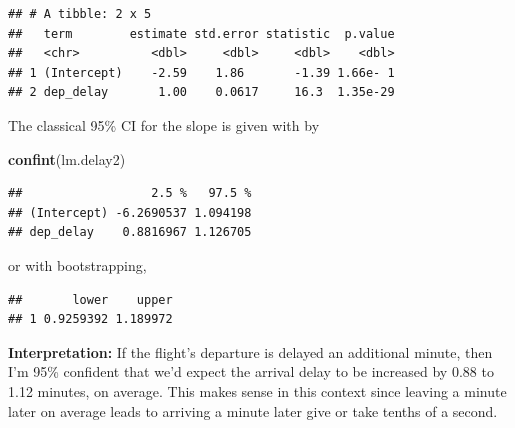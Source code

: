 \documentclass[
]{book}
\newenvironment{Shaded}{\begin{snugshade}}{\end{snugshade}}
\newcommand{\CommentTok}[1]{\textcolor[rgb]{0.56,0.35,0.01}{\textit{#1}}}
\newcommand{\DataTypeTok}[1]{\textcolor[rgb]{0.13,0.29,0.53}{#1}}
\newcommand{\DecValTok}[1]{\textcolor[rgb]{0.00,0.00,0.81}{#1}}
\newcommand{\FloatTok}[1]{\textcolor[rgb]{0.00,0.00,0.81}{#1}}
\newcommand{\KeywordTok}[1]{\textcolor[rgb]{0.13,0.29,0.53}{\textbf{#1}}}
\newcommand{\NormalTok}[1]{#1}
\newcommand{\OperatorTok}[1]{\textcolor[rgb]{0.81,0.36,0.00}{\textbf{#1}}}
\newcommand{\OtherTok}[1]{\textcolor[rgb]{0.56,0.35,0.01}{#1}}
\newcommand{\StringTok}[1]{\textcolor[rgb]{0.31,0.60,0.02}{#1}}
\begin{document}
\begin{verbatim}
## # A tibble: 2 x 5
##   term        estimate std.error statistic  p.value
##   <chr>          <dbl>     <dbl>     <dbl>    <dbl>
## 1 (Intercept)    -2.59    1.86       -1.39 1.66e- 1
## 2 dep_delay       1.00    0.0617     16.3  1.35e-29
\end{verbatim}

The classical 95\% CI for the slope is given with by

\begin{Shaded}
\begin{Highlighting}[]
\KeywordTok{confint}\NormalTok{(lm.delay2)}
\end{Highlighting}
\end{Shaded}

\begin{verbatim}
##                  2.5 %   97.5 %
## (Intercept) -6.2690537 1.094198
## dep_delay    0.8816967 1.126705
\end{verbatim}

or with bootstrapping,

\begin{Shaded}
\end{Shaded}

\begin{verbatim}
##       lower    upper
## 1 0.9259392 1.189972
\end{verbatim}

\textbf{Interpretation:} If the flight's departure is delayed an additional minute, then I'm 95\% confident that we'd expect the arrival delay to be increased by 0.88 to 1.12 minutes, on average. This makes sense in this context since leaving a minute later on average leads to arriving a minute later give or take tenths of a second.
\end{document}
